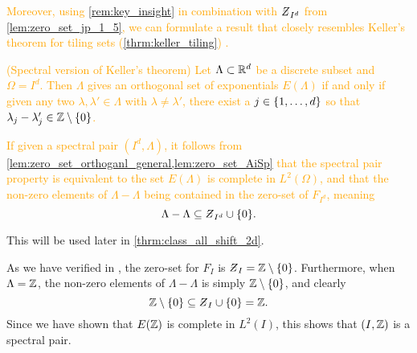 \documentclass[../thesis.tex]{subfiles}
\begin{document}
\textcolor{orange}{  %
Moreover, using \cref{rem:key_insight} in combination with $\Zstroke_{I^d}$ from \cref{lem:zero_set_jp_1_5}, we can formulate a result that closely resembles Keller's theorem for tiling sets (\cref{thrm:keller_tiling}) \cite{iosevichSpectralTilingProperties1998}.
\begin{lemma}(Spectral version of Keller's theorem)\label{lem:zero_set_AiSp}
    Let $\Lambda\subset \mathbb{R}^d$ be a discrete subset and $\Omega=I^d$. Then $\Lambda$ gives an orthogonal set of exponentials $E(\Lambda)$ if and only if given any two $\lambda,\lambda'\in \Lambda$ with $\lambda\neq\lambda'$, there exist a $j\in\{1,\dots,d\}$ so that $\lambda_j- \lambda_j'\in \mathbb{Z}\setminus\{0\}$.
\end{lemma}
} %

\textcolor{orange}{  %
\begin{remark}\label{rem:zero_set_orthogonal}  %
    If given a spectral pair $(I^d,\Lambda)$, it follows from \cref{lem:zero_set_orthoganl_general,lem:zero_set_AiSp} that the spectral pair property is equivalent to the set $E(\Lambda)$ is complete in $L^2(\Omega)$, and that the non-zero elements of $\Lambda - \Lambda$ being contained in the zero-set of $F_{I^d}$, meaning 
    \begin{equation*}%
        \Lambda - \Lambda \subseteq \Zstroke_{I^d} \cup \braq{0}.
    \end{equation*}
\end{remark}
} %
This  will be used later in \cref{thrm:class_all_shift_2d}.






\begin{example} %
    As we have verified in , the zero-set for $F_{I}$ is  $\Zstroke_{I} = \intnozero$. Furthermore, when $\Lambda=\mathbb{Z}$, the non-zero elements of $\Lambda - \Lambda$ is simply $\mathbb{Z}\setminus\{0\}$, and clearly
    \begin{equation*}
        \intnozero \subseteq \Zstroke_{I} \cup \braq{0} = \Z.
    \end{equation*}
    Since we have shown that $E(\mathbb{Z})$ is complete in $L^2(I)$, this shows that $(I,\mathbb{Z})$ is a spectral pair.
\end{example}
\end{document}
